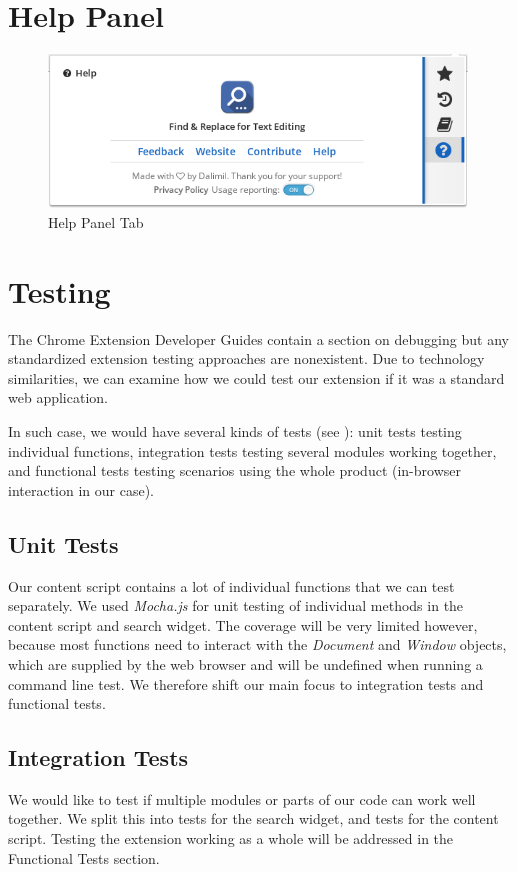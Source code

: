 \documentclass[bsc,frontabs,twoside,singlespacing,parskip,deptreport]{infthesis}
\begin{document}
\section{Help Panel}
\begin{figure}[h]
\centering
\includegraphics[width=0.99\textwidth]{../main/images/help/help-panel.png}
\caption{Help Panel Tab}
\end{figure}

\section{Testing}
The Chrome Extension Developer Guides contain a section on debugging \cite{C3} but any standardized extension testing approaches are nonexistent. Due to technology similarities, we can examine how we could test our extension if it was a standard web application.

In such case, we would have several kinds of tests (see \cite{A11}): unit tests testing individual functions, integration tests testing several modules working together, and functional tests testing scenarios using the whole product (in-browser interaction in our case).

\subsection{Unit Tests}
Our content script contains a lot of individual functions that we can test separately. We used \textit{Mocha.js} \cite{A12} for unit testing of individual methods in the content script and search widget. The coverage will be very limited however, because most functions need to interact with the \textit{Document} and \textit{Window} objects, which are supplied by the web browser and will be undefined when running a command line test. We therefore shift our main focus to integration tests and functional tests.

\subsection{Integration Tests}
We would like to test if multiple modules or parts of our code can work well together. We split this into tests for the search widget, and tests for the content script. Testing the extension working as a whole will be addressed in the Functional Tests section.
\end{document}
